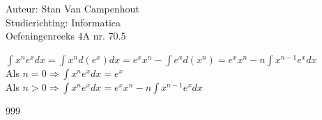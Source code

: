 \documentclass[a4paper]{article}
\begin{document}
  
\noindent \large Auteur: Stan Van Campenhout \\
\noindent \large Studierichting:  Informatica\\
\noindent \large Oefeningenreeks 4A nr. 70.5\\

\medskip

\normalsize

$ \displaystyle\int x^ne^xdx = \displaystyle\int x^nd\left(e^x\right)dx = e^xx^n-\displaystyle\int e^xd\left(x^n\right)
= e^xx^n-n\displaystyle\int x^{n-1}e^xdx $\\

Als $ n = 0 \Rightarrow \displaystyle\int x^ne^xdx = e^x $\\

Als $ n > 0 \Rightarrow  \displaystyle\int x^ne^xdx = e^xx^n-n\displaystyle\int x^{n-1}e^xdx $\\

\begin{thebibliography}{999}
\end{thebibliography}
\end{document}
